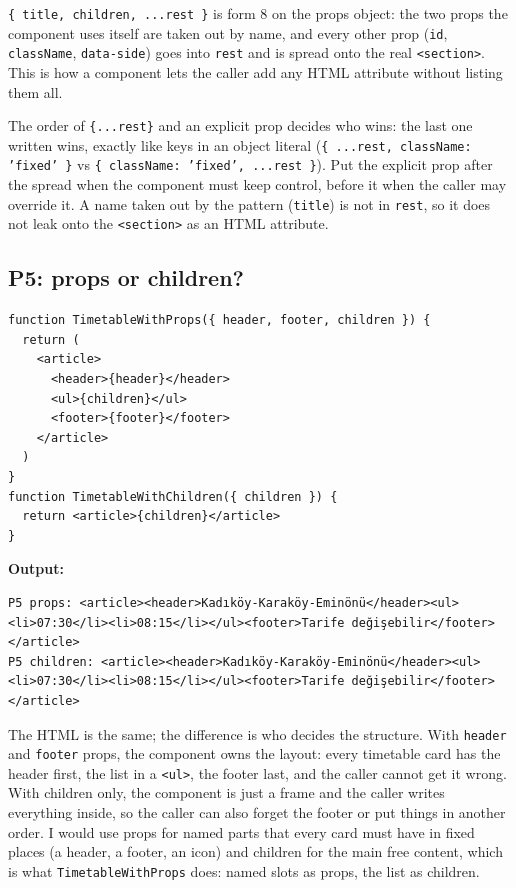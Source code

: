 \documentclass[
  10pt,
]{article}
\begin{document}
\texttt{\{ title,\allowbreak{} children,\allowbreak{} .\allowbreak{}.\allowbreak{}.\allowbreak{}rest \}}
is form 8 on the props object: the two props the component uses itself
are taken out by name, and every other prop (\texttt{id},
\texttt{className}, \texttt{data-side}) goes into \texttt{rest} and is
spread onto the real \texttt{<section>}. This is how a component lets
the caller add any HTML attribute without listing them all.

The order of \texttt{\{.\allowbreak{}.\allowbreak{}.\allowbreak{}rest\}}
and an explicit prop decides who wins: the last one written wins,
exactly like keys in an object literal
(\texttt{\{ .\allowbreak{}.\allowbreak{}.\allowbreak{}rest,\allowbreak{} className:\allowbreak{} 'fixed' \}}
vs
\texttt{\{ className:\allowbreak{} 'fixed',\allowbreak{} .\allowbreak{}.\allowbreak{}.\allowbreak{}rest \}}).
Put the explicit prop after the spread when the component must keep
control, before it when the caller may override it. A name taken out by
the pattern (\texttt{title}) is not in \texttt{rest}, so it does not
leak onto the \texttt{<section>} as an HTML attribute.

\hypertarget{p5-props-or-children}{%
\subsection{P5: props or children?}\label{p5-props-or-children}}

\begin{verbatim}
function TimetableWithProps({ header, footer, children }) {
  return (
    <article>
      <header>{header}</header>
      <ul>{children}</ul>
      <footer>{footer}</footer>
    </article>
  )
}
function TimetableWithChildren({ children }) {
  return <article>{children}</article>
}
\end{verbatim}

\textbf{Output:}

\begin{verbatim}
P5 props: <article><header>Kadıköy-Karaköy-Eminönü</header><ul><li>07:30</li><li>08:15</li></ul><footer>Tarife değişebilir</footer></article>
P5 children: <article><header>Kadıköy-Karaköy-Eminönü</header><ul><li>07:30</li><li>08:15</li></ul><footer>Tarife değişebilir</footer></article>
\end{verbatim}

The HTML is the same; the difference is who decides the structure. With
\texttt{header} and \texttt{footer} props, the component owns the
layout: every timetable card has the header first, the list in a
\texttt{<ul>}, the footer last, and the caller cannot get it wrong. With
children only, the component is just a frame and the caller writes
everything inside, so the caller can also forget the footer or put
things in another order. I would use props for named parts that every
card must have in fixed places (a header, a footer, an icon) and
children for the main free content, which is what
\texttt{TimetableWithProps} does: named slots as props, the list as
children.
\end{document}
